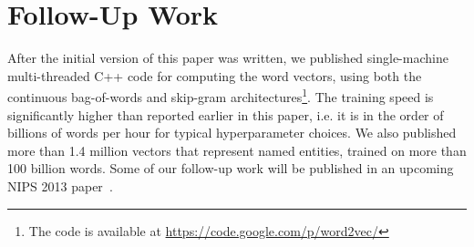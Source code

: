 \documentclass{article} %
\begin{document}
\section{Follow-Up Work}

After the initial version of this paper was written, we published
single-machine multi-threaded C++ code for computing the word vectors,
using both the continuous bag-of-words and
skip-gram architectures\footnote{The code
is available at \url{https://code.google.com/p/word2vec/}}.
The training speed is significantly higher
than reported earlier in this paper, i.e. it is in the order of
billions of words per hour for typical
hyperparameter choices. We also published more than 1.4 million
vectors that represent named entities, trained on more than 100
billion words.
Some of our follow-up work will be published in an upcoming NIPS 2013
paper~\cite{NIPS2013}.



\end{document}
